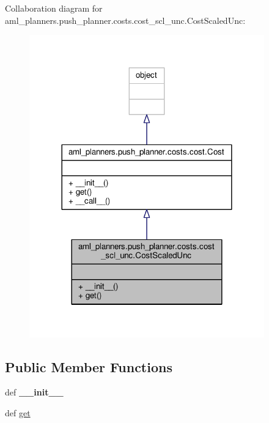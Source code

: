 Collaboration diagram for aml\-\_\-planners.\-push\-\_\-planner.\-costs.\-cost\-\_\-scl\-\_\-unc.\-Cost\-Scaled\-Unc\-:
\nopagebreak
\begin{figure}[H]
\begin{center}
\leavevmode
\includegraphics[width=288pt]{classaml__planners_1_1push__planner_1_1costs_1_1cost__scl__unc_1_1_cost_scaled_unc__coll__graph}
\end{center}
\end{figure}
\subsection*{Public Member Functions}
\begin{DoxyCompactItemize}
\item 
\hypertarget{classaml__planners_1_1push__planner_1_1costs_1_1cost__scl__unc_1_1_cost_scaled_unc_a9b35214f01d0f425c1db9e33b511e332}{def {\bfseries \-\_\-\-\_\-init\-\_\-\-\_\-}}\label{classaml__planners_1_1push__planner_1_1costs_1_1cost__scl__unc_1_1_cost_scaled_unc_a9b35214f01d0f425c1db9e33b511e332}

\item 
def \hyperlink{classaml__planners_1_1push__planner_1_1costs_1_1cost__scl__unc_1_1_cost_scaled_unc_a9a3a6dae7257fa41eb19ed1f4787c7c6}{get}
\end{DoxyCompactItemize}


